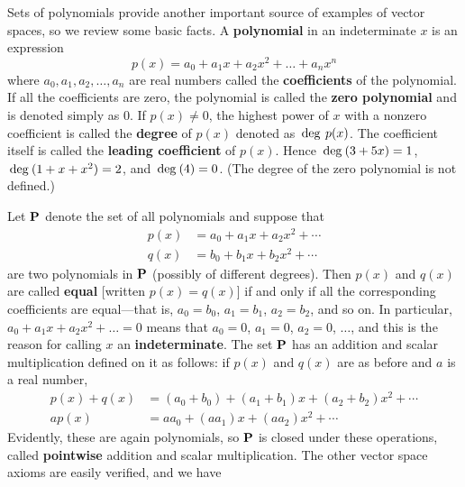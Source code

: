 Sets of polynomials provide another important source of examples of vector spaces, so we review some basic facts. A \textbf{polynomial} in an indeterminate $x$ is an expression
\begin{equation*}
p(x) = a_0 + a_1x + a_2x^2 + \dots + a_nx^n
\end{equation*}
where $a_{0}, a_{1}, a_{2}, \dots, a_{n}$ are real numbers called the \textbf{coefficients} of the polynomial. If all the coefficients are zero, the polynomial is called the \textbf{zero polynomial} and is denoted simply as $0$. If $p(x) \neq 0$, the highest power of $x$ with a nonzero coefficient is called the \textbf{degree} of $p(x)$ denoted as $\thinspace\operatorname{deg\medspace} p(x)$. The coefficient itself is called the \textbf{leading coefficient} of $p(x)$. Hence $\thinspace\operatorname{deg\medspace}(3 + 5x) = 1$, $\thinspace\operatorname{deg\medspace}(1 + x + x^{2}) = 2$, and $\thinspace\operatorname{deg\medspace}(4) = 0$. (The degree of the zero polynomial is not defined.)

Let $\textbf{P}$ denote the set of all polynomials and suppose that
\begin{align*}
p(x) &= a_0 + a_1x + a_2x^2 + \cdots \\
q(x) &= b_0 + b_1x + b_2x^2 + \cdots
\end{align*}
are two polynomials in $\textbf{P}$ (possibly of different degrees). Then $p(x)$ and $q(x)$ are called \textbf{equal} [written $p(x) = q(x)$] if and only if all the corresponding coefficients are equal---that is, $a_{0} = b_{0}$, $a_{1} = b_{1}$, $a_{2} = b_{2}$, and so on. In particular, $a_{0} + a_{1}x + a_{2}x^{2} + \dots = 0$ means that $a_{0} = 0$, $a_{1} = 0$, $a_{2} = 0$, $\dots$, and this is the reason for calling $x$ an \textbf{indeterminate}. The set $\textbf{P}$ has an addition and scalar multiplication defined on it as follows: if $p(x)$ and $q(x)$ are as before and $a$ is a real number,
\begin{align*}
p(x) + q(x) &= (a_0 + b_0) + (a_1 + b_1)x + (a_2 + b_2)x^2 + \cdots \\
ap(x) &= aa_0 + (aa_1)x + (aa_2)x^2 + \cdots
\end{align*} 
Evidently, these are again polynomials, so $\textbf{P}$ is closed under
these operations, called \textbf{pointwise} addition and scalar multiplication. The other vector space axioms are easily verified, and we have

